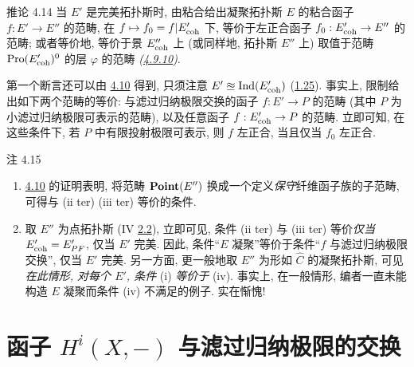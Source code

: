 \begin{enonce*}{推论 4.14}
当 $E'$ 是完美拓扑斯时,
由粘合给出凝聚拓扑斯 $E$ 的粘合函子 $f:E'\to E''$ 的范畴,
在 $f\mapsto f_0=f|E'_{\mathrm{coh}}$ 下,
等价于左正合函子 $f_0:E'_{\coh}\to E''$ 的范畴;
或者等价地, 等价于\pageoriginale{}景 $E''_{\mathrm{coh}}$ 上
(或同样地, 拓扑斯 $E''$ 上)
取值于范畴 $\operatorname{Pro}(E'_{\mathrm{coh}})^0$ 的层 $\varphi$ 的范畴
\emph{(\cf \hyperref[VI.subsubsec4.9.10]{4.9.10})}.
\end{enonce*}

第一个断言还可以由 \hyperref[VI.prop4.10]{4.10} 得到,
只须注意 $E'\approxeq\operatorname{Ind}(E'_{\mathrm{coh}})$
(\hyperref[VI.cor1.25]{1.25}).
事实上, 限制给出如下两个范畴的等价:
与滤过归纳极限交换的函子 $f:E'\to P$ 的范畴
(其中 $P$ 为小滤过归纳极限可表示的范畴),
以及任意函子 $f:E'_{\coh}\to P$ 的范畴.
立即可知, 在这些条件下,
若 $P$ 中有限投射极限可表示,
则 $f$ 左正合, 当且仅当 $f_0$ 左正合.

\begin{enonce*}[remark]{注 4.15}
\begin{enumerate}
\renewcommand{\theenumi}{\alph{enumi}}
\renewcommand{\labelenumi}{\theenumi)}
\item \hyperref[VI.prop4.10]{4.10} 的证明表明,
将范畴 $\operatorname{\mathbf{Point}}(E'')$ 换成一个定义\emph{保守}纤维函子族的子范畴,
可得与 (ii ter) \resp (iii ter) 等价的条件.

\item 取 $E''$ 为点拓扑斯
(IV \hyperref[IV.subsec2.2]{2.2}),
立即可见, 条件 (ii ter) 与 (iii ter)
等价\emph{仅当} $E'_{\mathrm{coh}}=E'_{PF}$,
\ie 仅当 $E'$ 完美.
因此, 条件“$E$ 凝聚”等价于条件“$f$ 与滤过归纳极限交换”,
仅当 $E'$ 完美.
另一方面, 更一般地取 $E''$ 为形如 $\widehat{C}$ 的凝聚拓扑斯,
可见\emph{在此情形, 对每个 $E'$, 条件} (i) \emph{等价于} (iv).
事实上, 在一般情形,
编者一直未能构造 $E$ 凝聚而条件 (iv) 不满足的例子.
实在惭愧!
\end{enumerate}
\end{enonce*}




\section{函子 $H^i(X,-)$ 与滤过归纳极限的交换}\pageoriginale

